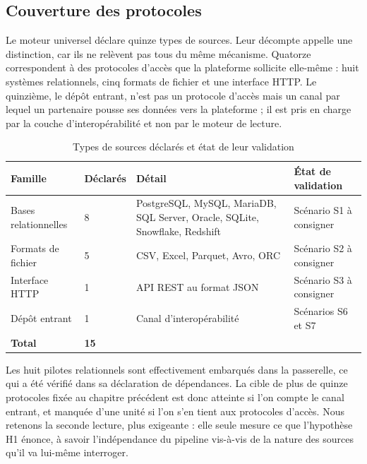 \subsection{Couverture des protocoles}

Le moteur universel déclare quinze types de sources. Leur décompte appelle une
distinction, car ils ne relèvent pas tous du même mécanisme. Quatorze
correspondent à des protocoles d'accès que la plateforme sollicite elle-même :
huit systèmes relationnels, cinq formats de fichier et une interface HTTP. Le
quinzième, le dépôt entrant, n'est pas un protocole d'accès mais un canal par
lequel un partenaire pousse ses données vers la plateforme ; il est pris en charge
par la couche d'interopérabilité et non par le moteur de lecture.

\begin{table}[htbp]
\centering
\caption{Types de sources déclarés et état de leur validation}
\label{tab:protocoles}
\small
\begin{tabularx}{\textwidth}{|p{3.2cm}|p{1.6cm}|p{4cm}|X|}
\hline
\textbf{Famille} & \textbf{Déclarés} & \textbf{Détail} & \textbf{État de validation} \\ \hline

Bases relationnelles & 8 & PostgreSQL, MySQL, MariaDB, SQL Server, Oracle, SQLite,
Snowflake, Redshift & Scénario S1 à consigner \\ \hline
Formats de fichier & 5 & CSV, Excel, Parquet, Avro, ORC & Scénario S2 à consigner \\ \hline
Interface HTTP & 1 & API REST au format JSON & Scénario S3 à consigner \\ \hline
Dépôt entrant & 1 & Canal d'interopérabilité & Scénarios S6 et S7 \\ \hline
\textbf{Total} & \textbf{15} & & \\ \hline

\end{tabularx}
\end{table}

Les huit pilotes relationnels sont effectivement embarqués dans la passerelle, ce
qui a été vérifié dans sa déclaration de dépendances. La cible de plus de quinze
protocoles fixée au chapitre précédent est donc atteinte si l'on compte le canal
entrant, et manquée d'une unité si l'on s'en tient aux protocoles d'accès. Nous
retenons la seconde lecture, plus exigeante : elle seule mesure ce que l'hypothèse
H1 énonce, à savoir l'indépendance du pipeline vis-à-vis de la nature des sources
qu'il va lui-même interroger.

